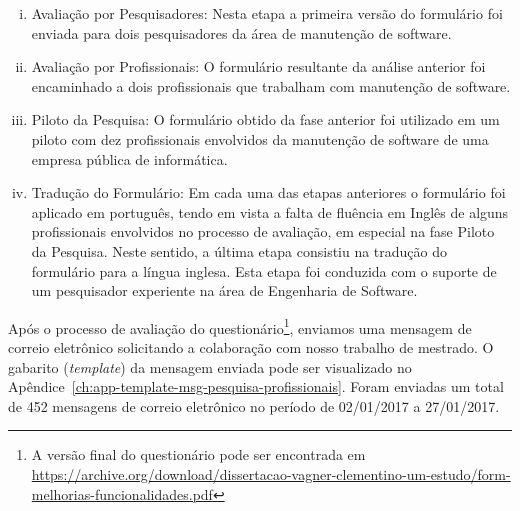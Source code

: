 \begin{enumerate}[(i)]
	\item Avaliação por Pesquisadores: Nesta etapa a primeira versão do
		formulário foi enviada para dois pesquisadores da área de manutenção de
		software.
	\item Avaliação por Profissionais: O formulário resultante da análise
		anterior foi encaminhado a dois profissionais que trabalham com
		manutenção de software.
	\item Piloto da Pesquisa: O formulário obtido da fase anterior foi utilizado
		em um piloto com dez profissionais envolvidos da manutenção de software
		de uma empresa pública de informática.
	\item Tradução do Formulário: Em cada uma das etapas anteriores o
		formulário foi aplicado em português, tendo em vista a falta de fluência
		em Inglês de alguns profissionais envolvidos no processo de avaliação,
		em especial na fase Piloto da Pesquisa. Neste sentido, a última etapa
		consistiu na tradução do formulário para a língua inglesa. Esta etapa
		foi conduzida com o suporte de um pesquisador experiente na área de
		Engenharia de Software.
\end{enumerate}

Após o processo de avaliação do questionário\footnote{A versão final do
    questionário pode ser encontrada em
    \url{https://archive.org/download/dissertacao-vagner-clementino-um-estudo/form-melhorias-funcionalidades.pdf}},
enviamos uma mensagem de correio eletrônico solicitando a colaboração com nosso
trabalho de mestrado. O gabarito (\textit{template}) da mensagem enviada pode
ser visualizado no Apêndice~\ref{ch:app-template-msg-pesquisa-profissionais}.
Foram enviadas um total de 452 mensagens de correio eletrônico no período de
02/01/2017 a 27/01/2017.



